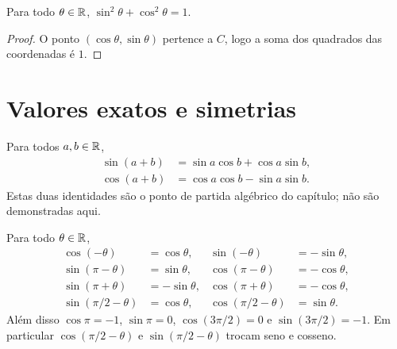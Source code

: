 \documentclass[11pt,a4paper]{article}
\begin{document}
\begin{proposicao}\label{prop:fundamental}
Para todo $\theta\in\mathbb{R}$, $\sin^2\theta+\cos^2\theta=1$.
\end{proposicao}

\begin{proof}
O ponto $(\cos\theta,\sin\theta)$ pertence a $C$, logo a soma dos quadrados das coordenadas é $1$.
\end{proof}


\section{Valores exatos e simetrias}

\begin{teorema}\label{teo:adicao}
Para todos $a,b\in\mathbb{R}$,
\begin{align*}
\sin(a+b)&=\sin a\cos b+\cos a\sin b,\\
\cos(a+b)&=\cos a\cos b-\sin a\sin b.
\end{align*}
Estas duas identidades são o ponto de partida algébrico do capítulo; não são demonstradas aqui.
\end{teorema}

\begin{proposicao}\label{prop:paridade}
Para todo $\theta\in\mathbb{R}$,
\begin{align*}
\cos(-\theta)&=\cos\theta,&
\sin(-\theta)&=-\sin\theta,\\
\sin(\pi-\theta)&=\sin\theta,&
\cos(\pi-\theta)&=-\cos\theta,\\
\sin(\pi+\theta)&=-\sin\theta,&
\cos(\pi+\theta)&=-\cos\theta,\\
\sin(\pi/2-\theta)&=\cos\theta,&
\cos(\pi/2-\theta)&=\sin\theta.
\end{align*}
Além disso $\cos\pi=-1$, $\sin\pi=0$, $\cos(3\pi/2)=0$ e $\sin(3\pi/2)=-1$. Em particular $\cos(\pi/2-\theta)$ e $\sin(\pi/2-\theta)$ trocam seno e cosseno.
\end{proposicao}
\end{document}
